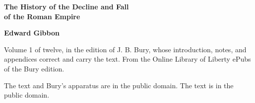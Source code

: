 \documentclass[11pt,letterpaper]{article}
\begin{document}
\color{ink}

\begin{titlepage}
\centering
\vspace*{4em}
{\LARGE\bfseries\color{heading} The History of the Decline and Fall\\[0.3em]of the Roman Empire\par}
\vspace{2em}
{\Large\bfseries\color{heading} Edward Gibbon\par}
\vspace{2.5em}
{\itshape\color{subhead}\parbox{0.8\linewidth}{\centering Volume 1 of twelve, in the edition of J. B. Bury, whose introduction, notes, and appendices correct and carry the text. From the Online Library of Liberty ePubs of the Bury edition.\par}}
\vfill
{\small The text and Bury's apparatus are in the public domain. The text is in the public domain.\par}
\vspace{2em}
\end{titlepage}

\tableofcontents


\end{document}
